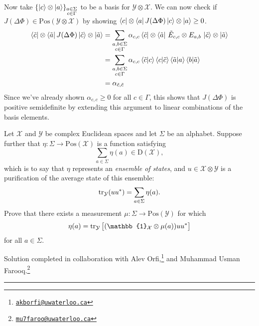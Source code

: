 \documentclass[boxes,pages,color=SeaGreen]{homework}
\newcommand{\collab}[1]{\footnote{\href{mailto:#1}{\texttt{#1}}}}
\newcommand{\I}{\mathbb{1}}
\newcommand{\X}{\mathcal{X}}
\newcommand{\Y}{\mathcal{Y}}
\newcommand{\Pos}{\mathrm{Pos}}
\newcommand{\Density}{\mathrm{D}}
\begin{document}
\begin{solution}
    Now take $\qty{\ket{c}\otimes\ket{a}}_{\substack{a\in\Sigma \\ c\in\Gamma}}$ to be a basis for $\Y\otimes\X$.
    We can now check if $J(\Delta\Phi)\in\Pos(\Y\otimes\X)$ by showing $\bra{c}\otimes\bra{a}J(\Delta\Phi)\ket{c}\otimes\ket{a}\geq 0$.
    \begin{align*}
        \bra{\tilde{c}}\otimes\bra{\tilde{a}}J(\Delta\Phi)\ket{\tilde{c}}\otimes\ket{\tilde{a}} & = \sum_{\substack{a,b\in\Sigma \\ c\in\Gamma}}\alpha_{c,c}\bra{\tilde{c}}\otimes\bra{\tilde{a}}\, \tilde{E}_{c,c}\otimes E_{a,b}\,\ket{\tilde{c}}\otimes\ket{\tilde{a}} \\
                                                                                                & = \sum_{\substack{a,b\in\Sigma \\ c\in\Gamma}}\alpha_{c,c}\braket{\tilde{c}}{c}\braket{c}{\tilde{c}}\braket{\tilde{a}}{a}\braket{b}{\tilde{a}} \\
                                                                                                & = \alpha_{\tilde{c},\tilde{c}}
    \end{align*}
    Since we've already shown $\alpha_{c,c} \geq 0$ for all $c\in\Gamma$, this shows that $J(\Delta\Phi)$ is positive semidefinite by extending this argument to linear combinations of the basis elements.
\end{solution}


\begin{problem}
Let $\X$ and $\Y$ be complex Euclidean spaces and let $\Sigma$ be an
alphabet.
Suppose further that $\eta:\Sigma\rightarrow\Pos(\X)$ is a function
satisfying
\[
    \sum_{a\in\Sigma} \eta(a) \in \Density(\X),
\]
which is to say that $\eta$ represents an \emph{ensemble of states},
and $u\in\X\otimes\Y$ is a purification of the average state of this
ensemble:
\[
    \tr_{\Y}( u u^{\ast} ) = \sum_{a\in\Sigma} \eta(a).
\]
Prove that there exists a measurement $\mu:\Sigma\rightarrow\Pos(\Y)$ for
which
\[
    \eta(a) = \tr_{\Y} \qty\big[(\I_{\X}\otimes\mu(a))u u^{\ast}]
\]
for all $a\in\Sigma$.
\end{problem}
\noindent Solution completed in collaboration with Alev Orfi,\collab{akborfi@uwaterloo.ca} and Muhammad Usman Farooq.\collab{mu7faroo@uwaterloo.ca}

{\noindent\color{SeaGreen!30}\rule{\textwidth}{1.5pt}}
\end{document}
